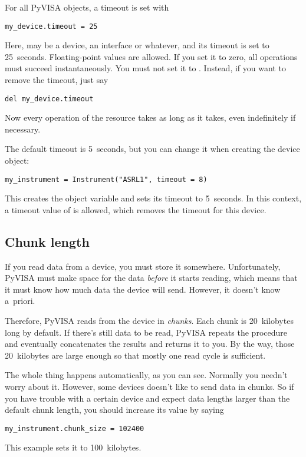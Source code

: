 \documentclass{howto}
\begin{document}
For all PyVISA objects, a timeout is set with
\begin{verbatim}
my_device.timeout = 25
\end{verbatim}
Here,  may be a device, an interface or whatever, and its
timeout is set to 25~seconds.  Floating-point values are allowed.  If you set
it to zero, all operations must succeed instantaneously.  You must not set it
to .  Instead, if you want to remove the timeout, just say
\begin{verbatim}
del my_device.timeout
\end{verbatim}
Now every operation of the resource takes as long as it takes, even
indefinitely if necessary.

The default timeout is 5~seconds, but you can change it when creating the
device object:
\begin{verbatim}
my_instrument = Instrument("ASRL1", timeout = 8)
\end{verbatim}
This creates the object variable  and sets its timeout to
5~seconds.  In this context, a timeout value of  is allowed, which
removes the timeout for this device.


\subsection{Chunk length}
\label{sec:chunk-length}

If you read data from a device, you must store it somewhere.  Unfortunately,
PyVISA must make space for the data \emph{before} it starts reading, which
means that it must know how much data the device will send.  However, it
doesn't know a~priori.

Therefore, PyVISA reads from the device in \emph{chunks}.  Each chunk is
20~kilobytes long by default.  If there's still data to be read, PyVISA repeats
the procedure and eventually concatenates the results and returns it to you.
By the way, those 20~kilobytes are large enough so that mostly one read cycle
is sufficient.

The whole thing happens automatically, as you can see.  Normally you needn't
worry about it.  However, some devices doesn't like to send data in chunks.  So
if you have trouble with a certain device and expect data lengths larger than
the default chunk length, you should increase its value by saying
\begin{verbatim}
my_instrument.chunk_size = 102400
\end{verbatim}
This example sets it to 100~kilobytes.
\end{document}
